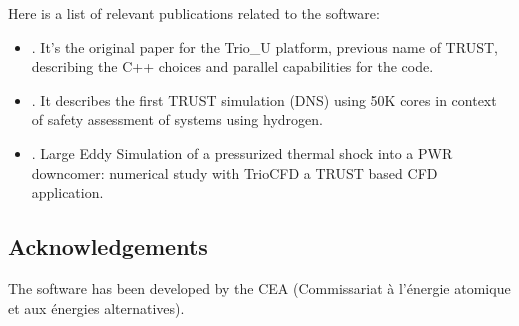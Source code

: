 Here is a list of relevant publications related to the software:

\begin{itemize}
   \item {}. It's the original paper for the Trio\_U platform, previous name of TRUST, describing the C++ choices and parallel capabilities for the code.
   \item {}. It describes the first TRUST simulation (DNS) using 50K cores in context of safety assessment of systems using hydrogen.
   \item {}. Large Eddy Simulation of a pressurized thermal shock into a PWR downcomer: numerical study with TrioCFD a TRUST based CFD application.
\end{itemize}

\subsection{Acknowledgements}
\label{sec::TRUST Platform:acknowledgements}

The software has been developed by the CEA (Commissariat à l'énergie atomique et aux énergies alternatives). 

